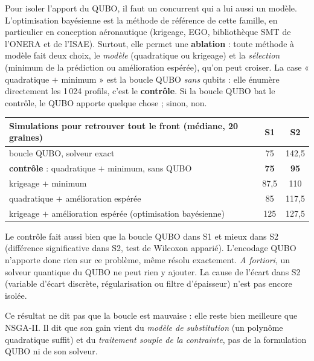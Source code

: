 Pour isoler l'apport du QUBO, il faut un concurrent qui a lui aussi un modèle. L'optimisation bayésienne est la méthode de référence de cette famille, en particulier en conception aéronautique (krigeage, EGO, bibliothèque SMT de l'ONERA et de l'ISAE). Surtout, elle permet une \textbf{ablation} : toute méthode à modèle fait deux choix, le \emph{modèle} (quadratique ou krigeage) et la \emph{sélection} (minimum de la prédiction ou amélioration espérée), qu'on peut croiser. La case « quadratique $+$ minimum » est la boucle QUBO \emph{sans} qubits : elle énumère directement les 1\,024 profils, c'est le \textbf{contrôle}. Si la boucle QUBO bat le contrôle, le QUBO apporte quelque chose ; sinon, non.

\begin{center}
\renewcommand{\arraystretch}{1.2}
\begin{tabular}{lcc}
\toprule
Simulations pour retrouver tout le front (médiane, 20 graines) & S1 & S2 \\
\midrule
boucle QUBO, solveur exact & 75 & 142,5 \\
\textbf{contrôle} : quadratique $+$ minimum, sans QUBO & \textbf{75} & \textbf{95} \\
krigeage $+$ minimum & 87,5 & 110 \\
quadratique $+$ amélioration espérée & 85 & 117,5 \\
krigeage $+$ amélioration espérée (optimisation bayésienne) & 125 & 127,5 \\
\bottomrule
\end{tabular}
\end{center}
Le contrôle fait aussi bien que la boucle QUBO dans S1 et mieux dans S2 (différence significative dans S2, test de Wilcoxon apparié). L'encodage QUBO n'apporte donc rien sur ce problème, même résolu exactement. \emph{A fortiori}, un solveur quantique du QUBO ne peut rien y ajouter. La cause de l'écart dans S2 (variable d'écart discrète, régularisation ou filtre d'épaisseur) n'est pas encore isolée.

\begin{projet}
Ce résultat ne dit pas que la boucle est mauvaise : elle reste bien meilleure que NSGA-II. Il dit que son gain vient du \emph{modèle de substitution} (un polynôme quadratique suffit) et du \emph{traitement souple de la contrainte}, pas de la formulation QUBO ni de son solveur.
\end{projet}

